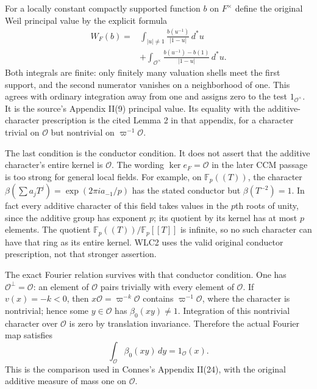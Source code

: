 For a locally constant compactly supported function $b$ on $F^\times$
define the original Weil principal value by the explicit formula
\begin{equation}\tag{WLC2}
\begin{split}
 W_F(b)={}&\int_{|u|\ne1}\frac{b(u^{-1})}{|1-u|}\,d^*u\\
 &+\int_{\mathcal O^\times}
       \frac{b(u^{-1})-b(1)}{|1-u|}\,d^*u.
\end{split}
\end{equation}
Both integrals are finite: only finitely many valuation shells
meet the first support, and the second numerator vanishes on a
neighborhood of one. This agrees with ordinary integration away
from one and assigns zero to the test $1_{\mathcal O^\times}$.
It is the source's Appendix II(9) principal value. Its equality
with the additive-character prescription is the cited Lemma 2
in that appendix, for a character trivial on $\mathcal O$ but
nontrivial on $\varpi^{-1}\mathcal O$.

The last condition is the conductor condition. It does not assert
that the additive character's entire kernel is $\mathcal O$.
The wording $\ker e_F=\mathcal O$ in the later CCM passage is
too strong for general local fields. For example, on
$\mathbb F_p((T))$, the character
$\beta(\sum a_jT^j)=\exp(2\pi i a_{-1}/p)$ has the stated
conductor but $\beta(T^{-2})=1$. In fact every additive character
of this field takes values in the $p$th roots of unity, since
the additive group has exponent $p$; its quotient by its kernel
has at most $p$ elements. The quotient
$\mathbb F_p((T))/\mathbb F_p[[T]]$ is infinite, so no such
character can have that ring as its entire kernel. WLC2 uses
the valid original conductor prescription, not that stronger
assertion.

The exact Fourier relation survives with that conductor condition.
One has $\mathcal O^\perp=\mathcal O$: an element of $\mathcal O$
pairs trivially with every element of $\mathcal O$. If
$v(x)=-k<0$, then $x\mathcal O=\varpi^{-k}\mathcal O$ contains
$\varpi^{-1}\mathcal O$, where the character is nontrivial;
hence some $y\in\mathcal O$ has $\beta_0(xy)\ne1$.
Integration of this nontrivial character over $\mathcal O$
is zero by translation invariance. Therefore the actual Fourier
map satisfies
\[
 \int_{\mathcal O}\beta_0(xy)\,dy=1_{\mathcal O}(x).
\]
This is the comparison used in Connes's Appendix II(24), with
the original additive measure of mass one on $\mathcal O$.

